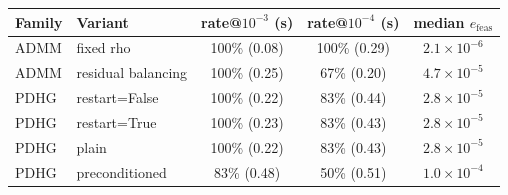 \begin{tabular}{llccc}
\toprule
Family & Variant & rate@$10^{-3}$ (s) & rate@$10^{-4}$ (s) & median $e_{\mathrm{feas}}$ \\
\midrule
ADMM & fixed rho & 100\% (0.08) & 100\% (0.29) & $2.1{\times}10^{-6}$ \\
ADMM & residual balancing & 100\% (0.25) & 67\% (0.20) & $4.7{\times}10^{-5}$ \\
PDHG & restart=False & 100\% (0.22) & 83\% (0.44) & $2.8{\times}10^{-5}$ \\
PDHG & restart=True & 100\% (0.23) & 83\% (0.43) & $2.8{\times}10^{-5}$ \\
PDHG & plain & 100\% (0.22) & 83\% (0.43) & $2.8{\times}10^{-5}$ \\
PDHG & preconditioned & 83\% (0.48) & 50\% (0.51) & $1.0{\times}10^{-4}$ \\
\bottomrule
\end{tabular}